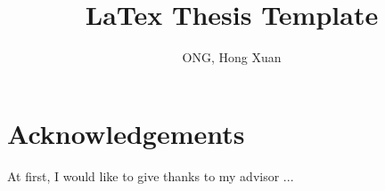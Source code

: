 \documentclass[12pt]{report}
\title{LaTex Thesis Template}	%
\author{ONG, Hong Xuan}			%
\begin{document}
%
\maketitle
\tableofcontents

%
\chapter*{Acknowledgements}
At first, I would like to give thanks to my advisor ...

%
\listoffigures
\listoftables

%
\newpage\cleardoublepage
\newpage\cleardoublepage
\newpage\cleardoublepage
\newpage\cleardoublepage
\newpage\cleardoublepage

\nocite{*}
\newpage\cleardoublepage

\end{document}
